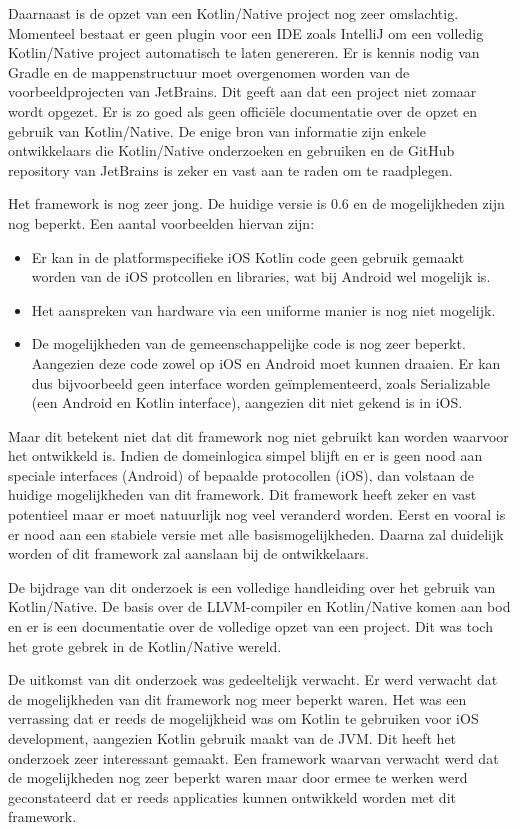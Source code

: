 Daarnaast is de opzet van een Kotlin/Native project nog zeer omslachtig. Momenteel bestaat er geen plugin voor een IDE zoals IntelliJ om een volledig Kotlin/Native project automatisch te laten genereren. Er is kennis nodig van Gradle en de mappenstructuur moet overgenomen worden van de voorbeeldprojecten van JetBrains. Dit geeft aan dat een project niet zomaar wordt opgezet. Er is zo goed als geen officiële documentatie over de opzet en gebruik van Kotlin/Native. De enige bron van informatie zijn enkele ontwikkelaars die Kotlin/Native onderzoeken en gebruiken en de GitHub repository van JetBrains is zeker en vast aan te raden om te raadplegen.

Het framework is nog zeer jong. De huidige versie is 0.6 en de mogelijkheden zijn nog beperkt. Een aantal voorbeelden hiervan zijn:
\begin{itemize}
	\item Er kan in de platformspecifieke iOS Kotlin code geen gebruik gemaakt worden van de iOS protcollen en libraries, wat bij Android wel mogelijk is.
	\item Het aanspreken van hardware via een uniforme manier is nog niet mogelijk.
	\item De mogelijkheden van de gemeenschappelijke code is nog zeer beperkt. Aangezien deze code zowel op iOS en Android moet kunnen draaien. Er kan dus bijvoorbeeld geen interface worden geïmplementeerd, zoals Serializable (een Android en Kotlin interface), aangezien dit niet gekend is in iOS.
\end{itemize}

Maar dit betekent niet dat dit framework nog niet gebruikt kan worden waarvoor het ontwikkeld is. Indien de domeinlogica simpel blijft en er is geen nood aan speciale interfaces (Android) of bepaalde protocollen (iOS), dan volstaan de huidige mogelijkheden van dit framework. Dit framework heeft zeker en vast potentieel maar er moet natuurlijk nog veel veranderd worden. Eerst en vooral is er nood aan een stabiele versie met alle basismogelijkheden. Daarna zal duidelijk worden of dit framework zal aanslaan bij de ontwikkelaars.

De bijdrage van dit onderzoek is een volledige handleiding over het gebruik van Kotlin/Native. De basis over de LLVM-compiler en Kotlin/Native komen aan bod en er is een documentatie over de volledige opzet van een project. Dit was toch het grote gebrek in de Kotlin/Native wereld.

De uitkomst van dit onderzoek was gedeeltelijk verwacht. Er werd verwacht dat de mogelijkheden van dit framework nog meer beperkt waren. Het was een verrassing dat er reeds de mogelijkheid was om Kotlin te gebruiken voor iOS development, aangezien Kotlin gebruik maakt van de JVM. Dit heeft het onderzoek zeer interessant gemaakt. Een framework waarvan verwacht werd dat de mogelijkheden nog zeer beperkt waren maar door ermee te werken werd geconstateerd dat er reeds applicaties kunnen ontwikkeld worden met dit framework. 

